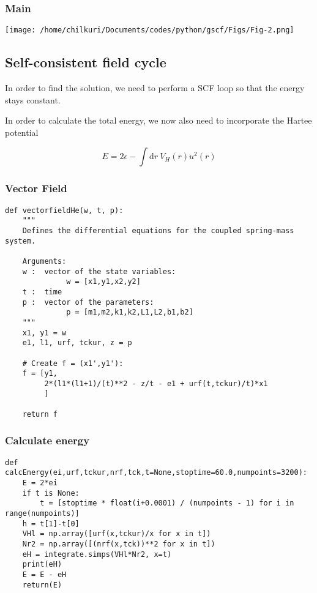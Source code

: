 \documentclass[11pt,a4paper]{article}
\begin{document}
\subsubsection{Main}
\label{sec:org51caa7e}
\begin{center}
\texttt{[image: /home/chilkuri/Documents/codes/python/gscf/Figs/Fig-2.png]}
\end{center}

\subsection{Self-consistent field cycle}
\label{sec:org07cac0b}

In order to find the solution, we need to perform a SCF loop
so that the energy stays constant.

In order to calculate the total energy, we now also need to
incorporate the Hartee potential

\[
E = 2 \epsilon - \int \text{d}r\ V_H(r) u^2(r)
\]


\subsubsection{Vector Field}
\label{sec:org607ff8f}
\begin{verbatim}
def vectorfieldHe(w, t, p):
    """
    Defines the differential equations for the coupled spring-mass system.

    Arguments:
    w :  vector of the state variables:
              w = [x1,y1,x2,y2]
    t :  time
    p :  vector of the parameters:
              p = [m1,m2,k1,k2,L1,L2,b1,b2]
    """
    x1, y1 = w
    e1, l1, urf, tckur, z = p

    # Create f = (x1',y1'):
    f = [y1,
         2*(l1*(l1+1)/(t)**2 - z/t - e1 + urf(t,tckur)/t)*x1
         ]

    return f
\end{verbatim}
\subsubsection{Calculate energy}
\label{sec:org5d50c29}
\begin{verbatim}
def calcEnergy(ei,urf,tckur,nrf,tck,t=None,stoptime=60.0,numpoints=3200):
    E = 2*ei
    if t is None:
        t = [stoptime * float(i+0.0001) / (numpoints - 1) for i in range(numpoints)]
    h = t[1]-t[0]
    VHl = np.array([urf(x,tckur)/x for x in t])
    Nr2 = np.array([(nrf(x,tck))**2 for x in t])
    eH = integrate.simps(VHl*Nr2, x=t)
    print(eH)
    E = E - eH
    return(E)
\end{verbatim}
\end{document}

